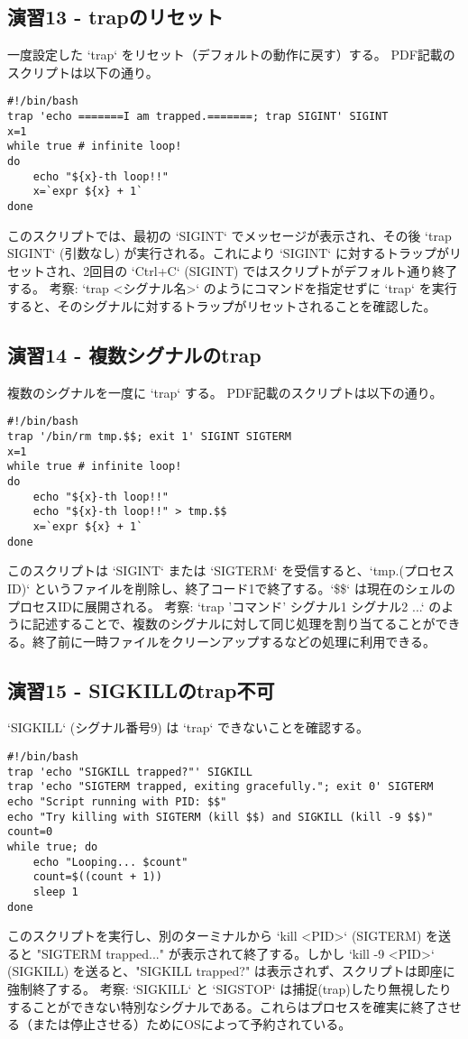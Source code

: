 \documentclass[a4paper,11pt]{jsarticle}
\begin{document}
\subsection*{演習13 - trapのリセット}
一度設定した `trap` をリセット（デフォルトの動作に戻す）する。
PDF記載のスクリプトは以下の通り。
\begin{lstlisting}[caption=演習13 trapリセットのスクリプト例]
#!/bin/bash
trap 'echo =======I am trapped.=======; trap SIGINT' SIGINT
x=1
while true # infinite loop!
do
    echo "${x}-th loop!!"
    x=`expr ${x} + 1`
done
\end{lstlisting}
このスクリプトでは、最初の `SIGINT` でメッセージが表示され、その後 `trap SIGINT` (引数なし) が実行される。これにより `SIGINT` に対するトラップがリセットされ、2回目の `Ctrl+C` (SIGINT) ではスクリプトがデフォルト通り終了する。
考察: `trap <シグナル名>` のようにコマンドを指定せずに `trap` を実行すると、そのシグナルに対するトラップがリセットされることを確認した。

\subsection*{演習14 - 複数シグナルのtrap}
複数のシグナルを一度に `trap` する。
PDF記載のスクリプトは以下の通り。
\begin{lstlisting}[caption=演習14 複数シグナルtrapのスクリプト例]
#!/bin/bash
trap '/bin/rm tmp.$$; exit 1' SIGINT SIGTERM
x=1
while true # infinite loop!
do
    echo "${x}-th loop!!"
    echo "${x}-th loop!!" > tmp.$$
    x=`expr ${x} + 1`
done
\end{lstlisting}
このスクリプトは `SIGINT` または `SIGTERM` を受信すると、`tmp.(プロセスID)` というファイルを削除し、終了コード1で終了する。`\$\$` は現在のシェルのプロセスIDに展開される。
考察: `trap 'コマンド' シグナル1 シグナル2 ...` のように記述することで、複数のシグナルに対して同じ処理を割り当てることができる。終了前に一時ファイルをクリーンアップするなどの処理に利用できる。

\subsection*{演習15 - SIGKILLのtrap不可}
`SIGKILL` (シグナル番号9) は `trap` できないことを確認する。
\begin{lstlisting}[caption=演習15 SIGKILL trap試行スクリプト例]
#!/bin/bash
trap 'echo "SIGKILL trapped?"' SIGKILL
trap 'echo "SIGTERM trapped, exiting gracefully."; exit 0' SIGTERM
echo "Script running with PID: $$"
echo "Try killing with SIGTERM (kill $$) and SIGKILL (kill -9 $$)"
count=0
while true; do
    echo "Looping... $count"
    count=$((count + 1))
    sleep 1
done
\end{lstlisting}
このスクリプトを実行し、別のターミナルから `kill <PID>` (SIGTERM) を送ると "SIGTERM trapped..." が表示されて終了する。しかし `kill -9 <PID>` (SIGKILL) を送ると、"SIGKILL trapped?" は表示されず、スクリプトは即座に強制終了する。
考察: `SIGKILL` と `SIGSTOP` は捕捉(trap)したり無視したりすることができない特別なシグナルである。これらはプロセスを確実に終了させる（または停止させる）ためにOSによって予約されている。
\end{document}
